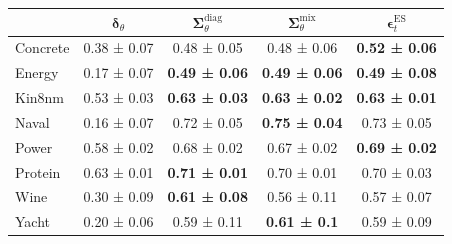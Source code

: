 \begin{tabular}{l|c|c|c|c}
\toprule
 & $\bm\delta_\theta$ & $\bm\Sigma_\theta^{\mathrm{diag}}$ & $\bm\Sigma_\theta^{\mathrm{mix}}$ & $\bm\epsilon_t^\mathrm{ES}$ \\
\midrule
Concrete & 0.38 ± 0.07 & 0.48 ± 0.05 & 0.48 ± 0.06 & \textbf{0.52 ± 0.06} \\
Energy & 0.17 ± 0.07 & \textbf{0.49 ± 0.06} & \textbf{0.49 ± 0.06} & \textbf{0.49 ± 0.08} \\
Kin8nm & 0.53 ± 0.03 & \textbf{0.63 ± 0.03} & \textbf{0.63 ± 0.02} & \textbf{0.63 ± 0.01} \\
Naval & 0.16 ± 0.07 & 0.72 ± 0.05 & \textbf{0.75 ± 0.04} & 0.73 ± 0.05 \\
Power & 0.58 ± 0.02 & 0.68 ± 0.02 & 0.67 ± 0.02 & \textbf{0.69 ± 0.02} \\
Protein & 0.63 ± 0.01 & \textbf{0.71 ± 0.01} & 0.70 ± 0.01 & 0.70 ± 0.03 \\
Wine & 0.30 ± 0.09 & \textbf{0.61 ± 0.08} & 0.56 ± 0.11 & 0.57 ± 0.07 \\
Yacht & 0.20 ± 0.06 & 0.59 ± 0.11 & \textbf{0.61 ± 0.1} & 0.59 ± 0.09 \\
\bottomrule
\end{tabular}

